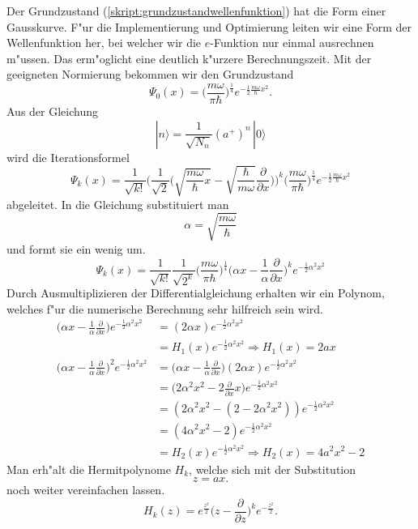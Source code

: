 \begin{refsection}
Der Grundzustand (\ref{skript:grundzustandwellenfunktion})
hat die Form einer Gausskurve.
F"ur die Implementierung und Optimierung leiten wir eine Form der Wellenfunktion her,
bei welcher wir die $e$-Funktion nur einmal ausrechnen m"ussen.
Das erm"oglicht eine deutlich k"urzere Berechnungszeit.
Mit der geeigneten Normierung bekommen wir den Grundzustand
\[
\Psi_0(x)
=
\biggl(\frac{m\omega}{\pi\hbar}\biggr)^\frac14
e^{-\frac12\frac{m\omega}{\hbar}x^2}.
\]
Aus der Gleichung
\[
|n\rangle
=
\frac{1}{\sqrt{N_n}}(a^+)^n\,|0\rangle
\]
wird die Iterationsformel
\begin{equation}
\Psi_k(x)
=
\frac1{\sqrt{k!}}\biggl(\frac1{\sqrt{2}}
\biggl(\sqrt{\frac{m\omega}{\hbar}x}-
\sqrt{\frac{\hbar}{m\omega}}\frac{\partial}{\partial x}\biggr)\biggr)^k
\biggl(\frac{m\omega}{\pi\hbar}\biggr)^\frac14
e^{-\frac12\frac{m\omega}{\hbar}x^2}
\label{skript:iterationsformel}
\end{equation}
abgeleitet.
In die Gleichung substituiert man
\[
\alpha=\sqrt{\frac{m\omega}\hbar}
\]
und formt sie ein wenig um.
\[
\Psi_k(x)
=
\frac1{\sqrt{k!}}\frac1{\sqrt{2^k}}
\biggl(\frac{m\omega}{\pi\hbar}\biggr)^\frac14
\biggl(\alpha x-\frac1{\alpha}\frac{\partial}{\partial x}\biggr)^k
e^{-\frac12\alpha^2x^2}
\]
Durch Ausmultiplizieren der Differentialgleichung erhalten wir ein Polynom,
welches f"ur die numerische Berechnung sehr hilfreich sein wird.
\begin{align*}
\biggl(\alpha x-\frac1{\alpha}\frac{\partial}{\partial x}\biggr)
e^{-\frac12\alpha^2x^2}
&=
(2\alpha x)e^{-\frac12\alpha^2x^2}
\\
&=
H_1(x)e^{-\frac12\alpha^2x^2}
\Rightarrow
H_1(x)
=
2ax
\\
\biggl(\alpha x-\frac1{\alpha}\frac{\partial}{\partial x}\biggr)^2
e^{-\frac12\alpha^2x^2}
&=
\biggl(\alpha x-\frac1{\alpha}\frac{\partial}{\partial x}\biggr)
(2\alpha x)e^{-\frac12\alpha^2x^2}
\\
&=
\biggl(2\alpha^2 x^2-2\frac{\partial}{\partial x}x\biggr)
e^{-\frac12\alpha^2x^2}
\\
&=
(2\alpha^2x^2-(2-2\alpha^2x^2))e^{-\frac12\alpha^2x^2}
\\
&=
(4\alpha^2x^2-2)e^{-\frac12\alpha^2x^2}
\\
&=
H_2(x)e^{-\frac12\alpha^2x^2}
\Rightarrow
H_2(x)
=
4a^2x^2-2
\end{align*}
Man erh"alt die Hermitpolynome $H_k$,
welche sich mit der Substitution
\[
z
=
ax.
\]
noch weiter vereinfachen lassen.
\[
H_k(z)
=
e^{\frac{z^2}2}\biggl(z-\frac{\partial}{\partial z}\biggr)^k
e^{-\frac{z^2}2}.
\]
\end{refsection}
